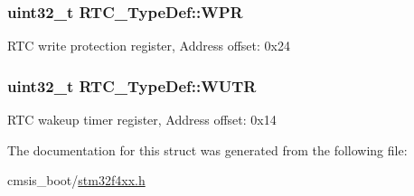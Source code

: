 \subsubsection[{\texorpdfstring{W\+PR}{WPR}}]{ uint32\+\_\+t R\+T\+C\+\_\+\+Type\+Def\+::\+W\+PR}\hypertarget{struct_r_t_c___type_def_ad54765af56784498a3ae08686b79a1ff}{}\label{struct_r_t_c___type_def_ad54765af56784498a3ae08686b79a1ff}
R\+TC write protection register, Address offset\+: 0x24 
\subsubsection[{\texorpdfstring{W\+U\+TR}{WUTR}}]{ uint32\+\_\+t R\+T\+C\+\_\+\+Type\+Def\+::\+W\+U\+TR}\hypertarget{struct_r_t_c___type_def_ad93017bb0a778a2aad9cd71211fc770a}{}\label{struct_r_t_c___type_def_ad93017bb0a778a2aad9cd71211fc770a}
R\+TC wakeup timer register, Address offset\+: 0x14 

The documentation for this struct was generated from the following file\+:\begin{DoxyCompactItemize}
\item 
cmsis\+\_\+boot/\hyperlink{stm32f4xx_8h}{stm32f4xx.\+h}\end{DoxyCompactItemize}
